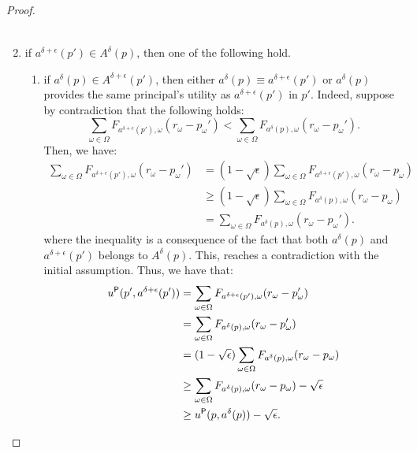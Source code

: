 \begin{proof}
\begin{enumerate}
\begin{align*}
		\end{align*}
		\item if $a^{\delta+\epsilon} (p') \in {A}^{\delta}(p)$, then one of the following hold.
		\begin{enumerate}
			\item if $a^\delta(p) \in {A}^{\delta+\epsilon}(p')$, then either $a^\delta(p) \equiv a^{\delta+\epsilon}(p')$ or $a^\delta(p)$  provides the same principal's utility as $a^{\delta+\epsilon} (p')$ in $p'$. Indeed, suppose by contradiction that the following holds:
			\begin{equation*}	
				\sum_{\omega \in \Omega} F_{ a^{\delta+\epsilon}(p'),\omega} (r_\omega-p_\omega') < \sum_{\omega \in \Omega} F_{ a^\delta(p),\omega} (r_\omega-p_\omega').
			\end{equation*}
			Then, we have:
			\begin{align*}	
				\sum_{\omega \in \Omega} F_{ a^{\delta+\epsilon}(p'),\omega} (r_\omega-p_\omega') 
				& = (1-\sqrt{\epsilon}) \sum_{\omega \in \Omega} F_{ a^{\delta+\epsilon}(p'),\omega} (r_\omega-p_\omega) \\
				& \ge (1-\sqrt{\epsilon}) \sum_{\omega \in \Omega} F_{ a^\delta(p),\omega} (r_\omega-p_\omega) \\
				& =  \sum_{\omega \in \Omega} F_{ a^\delta(p),\omega} (r_\omega-p_\omega').
			\end{align*}
			where the inequality is a consequence of the fact that both $a^\delta(p)$ and $a^{\delta+\epsilon}(p')$ belongs to ${A}^{\delta} (p)$. This, reaches a contradiction with the initial assumption. Thus, we have that:
			\begin{align*}	
				u^{\mathsf{P}} (p',a^{\delta+\epsilon}(p')) & = \sum_{\omega \in \Omega} F_{ a^{\delta+\epsilon}(p'),\omega} (r_\omega-p_\omega')\\ 
				&= \sum_{\omega \in \Omega} F_{ a^\delta(p),\omega} (r_\omega-p_\omega')\\
				& = (1-\sqrt{\epsilon}) \sum_{\omega \in \Omega} F_{ a^{\delta}(p),\omega} (r_\omega-p_\omega)\\
				& \ge \sum_{\omega \in \Omega} F_{ a^{\delta}(p),\omega} (r_\omega-p_\omega) -\sqrt{\epsilon}\\
				& \ge u^{\mathsf{P}} (p, a^\delta(p)) -\sqrt{\epsilon}.
			\end{align*}
			

\end{enumerate}
\end{enumerate}
\end{proof}
